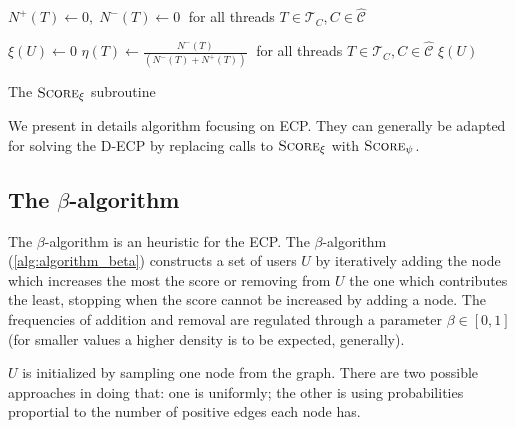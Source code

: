 \begin{algorithm}
	\SetAlgoLined
	$N^{+} (T) \leftarrow 0, \; N^{-} (T) \leftarrow 0\; $ for all threads $T
		\in \mathcal{T}_{C}, C \in \mathcal{\hat{C}}   $ \;


	$\xi(U) \leftarrow 0$ \;
	$\eta(T) \leftarrow\frac{N^{-}(T)}{(N^{-}(T) + N^{+} (T))} \; $ for all threads $T
		\in \mathcal{T}_{C}, C \in \mathcal{\hat{C}}   $  \;
	\Return $\xi(U)$ \;

	\caption{The $\textsc{Score}_{\xi}  $ subroutine}
	\label{alg:score_xi}
\end{algorithm}

We present in details algorithm focusing on \acrshort{ECP}. They can generally be
adapted for solving the \acrshort{D-ECP} by replacing calls to
$\textsc{Score}_{\xi}$ with $\textsc{Score}_{\psi}$.

\subsection{The $\beta$-algorithm}%
\label{ssub:the_beta_approach}

The $\beta$-algorithm is an heuristic for the \acrshort{ECP}. The
$\beta$-algorithm (\autoref{alg:algorithm_beta}) constructs a set of users $U$ by
iteratively adding the node which increases the most the score or removing from
$U$ the one which contributes the least, stopping when the score cannot be
increased by adding a node. The frequencies of addition and removal are regulated
through a parameter $\beta \in [0, 1]$ (for smaller values a higher density is to be expected,
generally).

$U$ is initialized by sampling one node from the graph. There are two possible
approaches in doing that: one is uniformly;
the other is using probabilities proportial to the number
of positive edges each node has.

